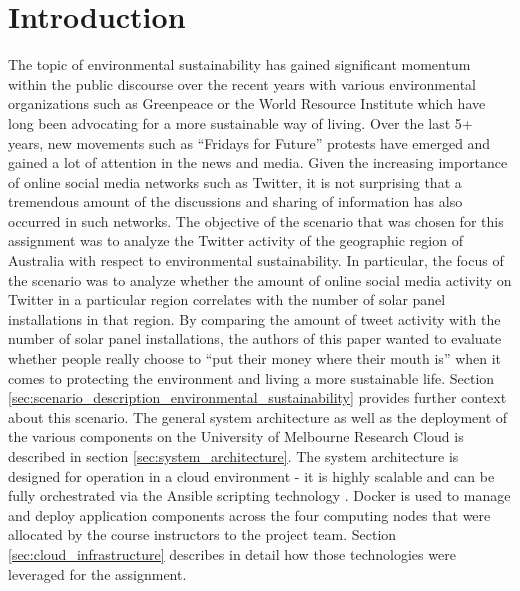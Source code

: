 \documentclass[11pt, oneside]{article}
\begin{document}
\section{Introduction}
The topic of environmental sustainability has gained significant momentum within the public discourse over the recent years with various environmental organizations such as Greenpeace or the World Resource Institute which have long been advocating for a more sustainable way of living. Over the last 5+ years, new movements such as \enquote{Fridays for Future} protests have emerged and gained a lot of attention in the news and media. Given the increasing importance of online social media networks such as Twitter, it is not surprising that a tremendous amount of the discussions and sharing of information has also occurred in such networks. 
\newline
\newline
The objective of the scenario that was chosen for this assignment was to analyze the Twitter activity of the geographic region of Australia with respect to environmental sustainability. In particular, the focus of the scenario was to analyze whether the amount of online social media activity on Twitter in a particular region correlates with the number of solar panel installations in that region. 
\newline
By comparing the amount of tweet activity with the number of solar panel installations, the authors of this paper wanted to evaluate whether people really choose to  \enquote{put their money where their mouth is} when it comes to protecting the environment and living a more sustainable life. Section \ref{sec:scenario_description_environmental_sustainability} provides further context about this scenario.
\newline
\newline
The general system architecture as well as the deployment of the various components on the University of Melbourne Research Cloud is described in section \ref{sec:system_architecture}. The system architecture is designed for operation in a cloud environment - it is highly scalable and can be fully orchestrated via the Ansible scripting technology \citep{ansible}. Docker \citep{docker} is used to manage and deploy application components across the four computing nodes that were allocated by the course instructors to the project team. Section \ref{sec:cloud_infrastructure} describes in detail how those technologies were leveraged for the assignment.
\newline
\newline
\end{document}
